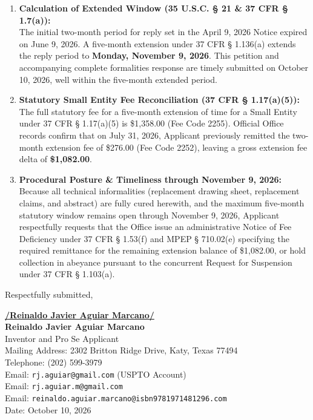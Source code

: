 \documentclass[11pt,letterpaper]{article}
\begin{document}
\begin{enumerate}[leftmargin=*]
    \item \textbf{Calculation of Extended Window (35 U.S.C. \S{} 21 \& 37 CFR \S{} 1.7(a)):} \\
    The initial two-month period for reply set in the April 9, 2026 Notice expired on June 9, 2026. A five-month extension under 37 CFR \S{} 1.136(a) extends the reply period to \textbf{Monday, November 9, 2026}. This petition and accompanying complete formalities response are timely submitted on October 10, 2026, well within the five-month extended period.

    \item \textbf{Statutory Small Entity Fee Reconciliation (37 CFR \S{} 1.17(a)(5)):} \\
    The full statutory fee for a five-month extension of time for a Small Entity under 37 CFR \S{} 1.17(a)(5) is \$1,358.00 (Fee Code 2255). Official Office records confirm that on July 31, 2026, Applicant previously remitted the two-month extension fee of \$276.00 (Fee Code 2252), leaving a gross extension fee delta of \textbf{\$1,082.00}.

    \item \textbf{Procedural Posture \& Timeliness through November 9, 2026:} \\
    Because all technical informalities (replacement drawing sheet, replacement claims, and abstract) are fully cured herewith, and the maximum five-month statutory window remains open through November 9, 2026, Applicant respectfully requests that the Office issue an administrative Notice of Fee Deficiency under 37 CFR \S{} 1.53(f) and MPEP \S{} 710.02(e) specifying the required remittance for the remaining extension balance of \$1,082.00, or hold collection in abeyance pursuant to the concurrent Request for Suspension under 37 CFR \S{} 1.103(a).
\end{enumerate}

\vspace{0.6cm}
\begin{singlespace}
\noindent Respectfully submitted, \par\vspace{0.8cm}
\underline{\textbf{/Reinaldo Javier Aguiar Marcano/}} \\
\textbf{Reinaldo Javier Aguiar Marcano} \\
Inventor and Pro Se Applicant \\
Mailing Address: 2302 Britton Ridge Drive, Katy, Texas 77494 \\
Telephone: (202) 599-3979 \\
Email: \texttt{rj.aguiar@gmail.com} (USPTO Account) \\
Email: \texttt{rj.aguiar.m@gmail.com} \\
Email: \texttt{reinaldo.aguiar.marcano@isbn9781971481296.com} \\
Date: October 10, 2026
\end{singlespace}
\end{document}
